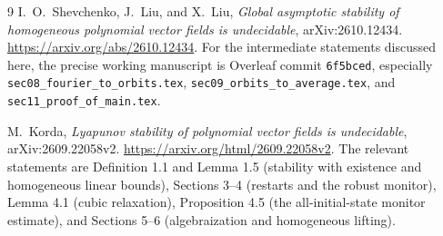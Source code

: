 \documentclass[11pt]{article}
\newcommand{\code}[1]{{\small\nolinkurl{#1}}}
\begin{document}
\begin{thebibliography}{9}
I.~O.~Shevchenko, J.~Liu, and X.~Liu,
\emph{Global asymptotic stability of homogeneous polynomial vector fields
is undecidable}, arXiv:2610.12434.
\url{https://arxiv.org/abs/2610.12434}.
For the intermediate statements discussed here, the precise working
manuscript is Overleaf commit \code{6f5bced}, especially
\code{sec08_fourier_to_orbits.tex}, \code{sec09_orbits_to_average.tex}, and
\code{sec11_proof_of_main.tex}.

M.~Korda,
\emph{Lyapunov stability of polynomial vector fields is undecidable},
arXiv:2609.22058v2.
\url{https://arxiv.org/html/2609.22058v2}.
The relevant statements are Definition 1.1 and Lemma 1.5 (stability with
existence and homogeneous linear bounds), Sections 3--4 (restarts and the
robust monitor), Lemma 4.1 (cubic relaxation), Proposition 4.5 (the
all-initial-state monitor estimate), and Sections 5--6 (algebraization and
homogeneous lifting).
\end{thebibliography}
\end{document}
